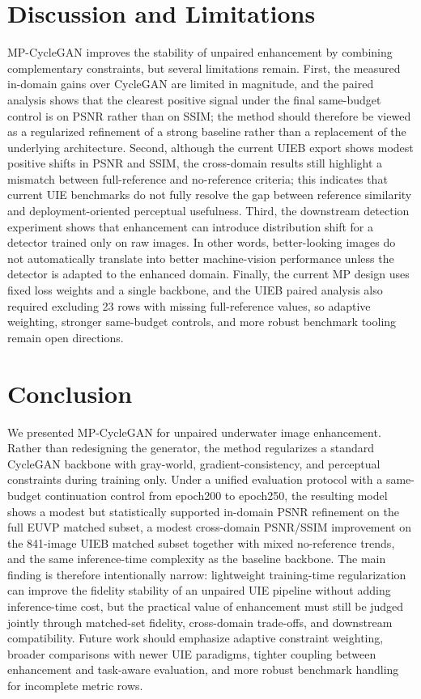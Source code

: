\documentclass[final,1p,times]{elsarticle}
\begin{document}
\section{Discussion and Limitations}
MP-CycleGAN improves the stability of unpaired enhancement by combining complementary constraints, but several limitations remain. First, the measured in-domain gains over CycleGAN are limited in magnitude, and the paired analysis shows that the clearest positive signal under the final same-budget control is on PSNR rather than on SSIM; the method should therefore be viewed as a regularized refinement of a strong baseline rather than a replacement of the underlying architecture. Second, although the current UIEB export shows modest positive shifts in PSNR and SSIM, the cross-domain results still highlight a mismatch between full-reference and no-reference criteria; this indicates that current UIE benchmarks do not fully resolve the gap between reference similarity and deployment-oriented perceptual usefulness. Third, the downstream detection experiment shows that enhancement can introduce distribution shift for a detector trained only on raw images. In other words, better-looking images do not automatically translate into better machine-vision performance unless the detector is adapted to the enhanced domain. Finally, the current MP design uses fixed loss weights and a single backbone, and the UIEB paired analysis also required excluding 23 rows with missing full-reference values, so adaptive weighting, stronger same-budget controls, and more robust benchmark tooling remain open directions.

\section{Conclusion}
We presented MP-CycleGAN for unpaired underwater image enhancement. Rather than redesigning the generator, the method regularizes a standard CycleGAN backbone with gray-world, gradient-consistency, and perceptual constraints during training only. Under a unified evaluation protocol with a same-budget continuation control from epoch200 to epoch250, the resulting model shows a modest but statistically supported in-domain PSNR refinement on the full EUVP matched subset, a modest cross-domain PSNR/SSIM improvement on the 841-image UIEB matched subset together with mixed no-reference trends, and the same inference-time complexity as the baseline backbone. The main finding is therefore intentionally narrow: lightweight training-time regularization can improve the fidelity stability of an unpaired UIE pipeline without adding inference-time cost, but the practical value of enhancement must still be judged jointly through matched-set fidelity, cross-domain trade-offs, and downstream compatibility. Future work should emphasize adaptive constraint weighting, broader comparisons with newer UIE paradigms, tighter coupling between enhancement and task-aware evaluation, and more robust benchmark handling for incomplete metric rows.
\end{document}
